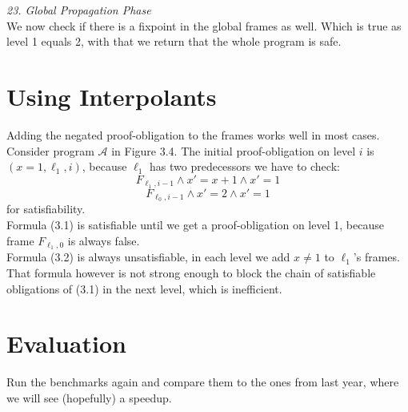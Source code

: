 \documentclass{article}
\begin{document}
\textsl{23. Global Propagation Phase} \\
We now check if there is a fixpoint in the global frames as well. Which is true as level 1 equals 2, with that we return that the whole program is safe.

	
	
	
	\pagebreak
	\section{Using Interpolants}
	Adding the negated proof-obligation to the frames works well in most cases. Consider program $\mathcal{A}$ in Figure 3.4. The initial proof-obligation on level $i$ is $(x = 1, \ell_1, i)$, because $\ell_1$ has two predecessors we have to check:
	\begin{equation}
	F_{\ell_1, i - 1} \land x' = x + 1 \land x' = 1
	\end{equation}
	\begin{equation}
	F_{\ell_0, i - 1} \land x' = 2 \land x' = 1
	\end{equation}
	for satisfiability. \\
	Formula (3.1) is satisfiable until we get a proof-obligation on level 1, because frame $F_{\ell_1, 0}$ is always false. \\
	Formula (3.2) is always unsatisfiable, in each level we add $x \neq 1$ to $\ell_1$'s frames. That formula however is not strong enough to block the chain of satisfiable obligations of (3.1) in the next level, which is inefficient.
	
	
	
	\section{Evaluation}
	Run the benchmarks again and compare them to the ones from last year, where we will see (hopefully) a speedup.
	
	\pagebreak
	



	
\end{document}
